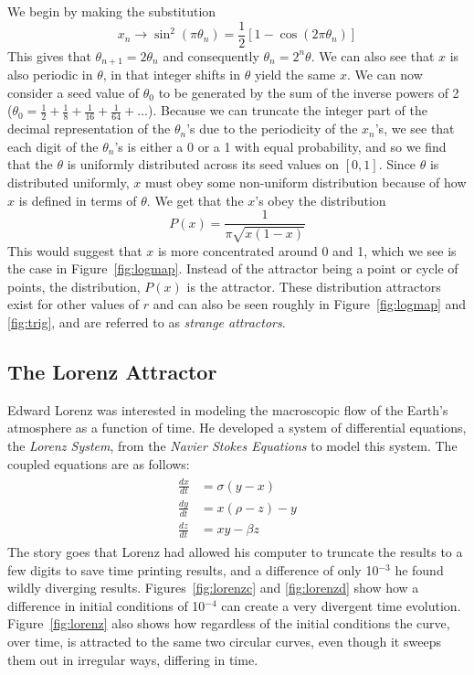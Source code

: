 \documentclass[paper=a4, fontsize=11pt, abstract=on]{scrartcl} %
\numberwithin{equation}{section}
\numberwithin{figure}{section}
\numberwithin{table}{section}
\begin{document}
We begin by making the substitution
\begin{equation}
  \label{eq:sub}
  x_n \rightarrow \sin^2(\pi \theta_n) = \frac{1}{2}[1-\cos(2\pi \theta_n)]  
\end{equation}
This gives that $\theta_{n+1} = 2\theta_n$ and consequently $\theta_n
= 2^n\theta$. We can also see that $x$ is also periodic in $\theta$,
in that integer shifts in $\theta$ yield the same $x$. We can now
consider a seed value of $\theta_0$ to be generated by the sum of the
inverse powers of 2 ($\theta_0 =
\frac{1}{2}+\frac{1}{8}+\frac{1}{16}+\frac{1}{64}+...$). Because we
can truncate the integer part of the decimal representation of the
$\theta_n$'s due to the periodicity of the $x_n$'s, we see that each
digit of the $\theta_n$'s is either a 0 or a 1 with equal probability,
and so we find that the $\theta$ is uniformly distributed across its
seed values on $[0,1]$. Since $\theta$ is distributed uniformly, $x$
must obey some non-uniform distribution because of how $x$ is defined
in terms of $\theta$. We get that the $x$'s obey the distribution
\begin{equation}
  \label{eq:dist}
  P(x) = \frac{1}{\pi\sqrt{x(1-x)}}
\end{equation}
This would suggest that $x$ is more concentrated around 0 and 1, which
we see is the case in Figure~\ref{fig:logmap}. Instead of the
attractor being a point or cycle of points, the distribution, $P(x)$
is the attractor. These distribution attractors exist for other values
of $r$ and can also be seen roughly in Figure~\ref{fig:logmap} and
\ref{fig:trig}, and are referred to as \emph{strange attractors}.

\subsection{The Lorenz Attractor}
\label{sec:lor}

Edward Lorenz\cite{lorenz} was interested in modeling the macroscopic
flow of the Earth's atmosphere as a function of time. He developed a
system of differential equations, the \emph{Lorenz System}, from the
\emph{Navier Stokes Equations} to model this system. The coupled
equations are as follows:
\begin{align}
  \label{eq:lorenz}
  \begin{split}
    \frac{dx}{dt} &= \sigma (y - x) \\
    \frac{dy}{dt} &= x(\rho - z) - y \\
    \frac{dz}{dt} &= xy - \beta z
  \end{split}
\end{align}
The story goes that Lorenz had allowed his computer to truncate the
results to a few digits to save time printing results, and a
difference of only 10$^{-3}$ he found wildly diverging
results. Figures~\ref{fig:lorenzc} and \ref{fig:lorenzd} show how a
difference in initial conditions of 10$^{-4}$ can create a very
divergent time evolution. Figure~\ref{fig:lorenz} also shows how
regardless of the initial conditions the curve, over time, is
attracted to the same two circular curves, even though it sweeps them
out in irregular ways, differing in time.
\end{document}
